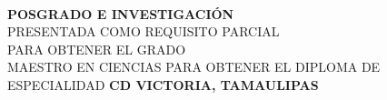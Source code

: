 \begin{titlepage}
\centering
\\ %
{\large\bfseries POSGRADO E INVESTIGACIÓN}
\vfill
{\large\bfseries \MakeUppercase\elTitulo}
\vfill
{\large\bfseries \MakeUppercase\elEstudiante}
\vfill
{\large\bfseries \MakeUppercase{\tipoDocumento}}\\
{\large PRESENTADA COMO REQUISITO PARCIAL}\\
\ifnum{}\relax
    {\large PARA OBTENER EL GRADO}\\
    {\large MAESTRO EN CIENCIAS}
\else
    \ifnum{}\relax
        {\large PARA OBTENER EL DIPLOMA DE}\\
        {\large ESPECIALIDAD}
    \fi
\fi
\vfill
{\large\bfseries \MakeUppercase{\elPrograma}}
\vfill
\begingroup
    \singlespacing
    {\large\bfseries CD VICTORIA, TAMAULIPAS}\\
    \vspace{-0.3cm} %
    {\large\bfseries \elanioTesis}
\endgroup
\end{titlepage}